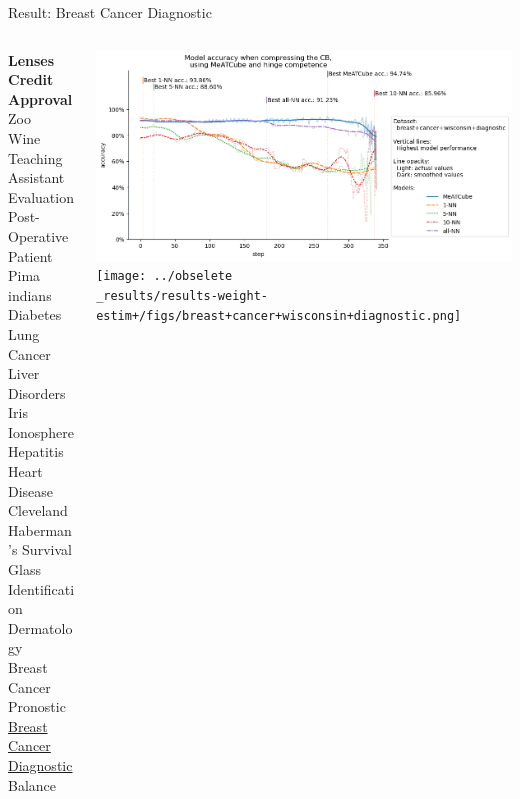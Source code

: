 \documentclass[]{beamer}
\begin{document}
\begin{frame}{Result: Breast Cancer Diagnostic}
    \begin{columns}
        \begin{column}{.3\textwidth}
            {\smaller\smaller\smaller
            \textbf{Lenses} \\
            \textbf{Credit Approval} \\
            Zoo \\
            Wine \\
            Teaching Assistant Evaluation \\
            Post-Operative Patient \\
            Pima indians Diabetes \\
            Lung Cancer \\
            Liver Disorders \\
            Iris \\
            Ionosphere \\
            Hepatitis \\
            Heart Disease Cleveland \\
            Haberman's Survival \\
            Glass Identification \\
            Dermatology \\
            Breast Cancer Pronostic \\
            \underline{Breast Cancer Diagnostic} \\
            Balance\\
            ~}
        \end{column}
        \begin{column}{.7\textwidth}
            \includegraphics[width=\textwidth]{../results-no-sim-tuning+/figs/breast+cancer+wisconsin+diagnostic.png}
            \texttt{[image: ../obselete\\\_results/results-weight-estim+/figs/breast+cancer+wisconsin+diagnostic.png]}
        \end{column}
    \end{columns}
\end{frame}
\end{document}
